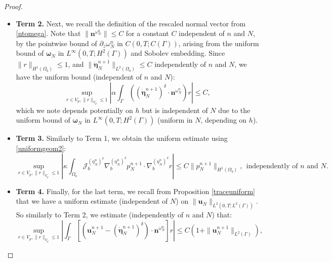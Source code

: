 \documentclass[10pt,a4paper]{amsart}
\newcommand{\bd}{\boldsymbol}
\begin{document}
\begin{proof}
\begin{itemize}
\begin{equation*}
\sup_{r \in V_{p}, \|r\|_{V_{p}} \le 1} \left|\alpha \int_{\Omega_{b}} \mathcal{J}^{(\eta^{n}_{N})^{\delta}}_{b} (\dot{\bd{\eta}}^{n + 1}_{N})^{\delta} \cdot \nabla^{(\eta^{n}_{N})^{\delta}}_{b} r \right| \le C, \qquad \text{ independently of $n$ and $N$}.
\end{equation*}
\item \textbf{Term 2.} Next, we recall the definition of the rescaled normal vector from \eqref{ntomega}. Note that $\|\bd{n}^{\omega^{n}_{N}}\| \le C$ for a constant $C$ independent of $n$ and $N$, by the pointwise bound of $\partial_{z}\omega^{n}_{N}$ in $C(0, T; C(\Gamma))$, arising from the uniform bound of $\bd{\omega}_{N}$ in $L^{\infty}(0, T; H^{2}(\Gamma))$ and Sobolev embedding. Since $\|r\|_{H^{1}(\Omega_{b})} \le 1$, and $\|\dot{\bd{\eta}}^{n + 1}_{N}\|_{L^{2}(\Omega_{b})} \le C$ independently of $n$ and $N$, we have the uniform bound (independent of $n$ and $N$):
\begin{equation*}
\sup_{r \in V_{p}, \|r\|_{V_{p}} \le 1} \left|\alpha \int_{\Gamma} \left(\left(\dot{\bd{\eta}}^{n + 1}_{N}\right)^{\delta} \cdot \bd{n}^{\omega^{n}_{N}}\right) r\right| \le C,
\end{equation*}
which we note depends potentially on $h$ but is independent of $N$ due to the uniform bound of $\bd{\omega}_{N}$ in $L^{\infty}(0, T; H^{2}(\Gamma))$ (uniform in $N$, depending on $h$).  
\item \textbf{Term 3.} Similarly to Term 1, we obtain the uniform estimate using \eqref{uniformgeom2}:
\begin{equation*}
\sup_{r \in V_{p}, \|r\|_{V_{p}} \le 1} \left|\kappa \int_{\Omega_{b}} \mathcal{J}^{(\eta^{n}_{N})^{\delta}}_{b} \nabla^{(\eta^{n}_{N})^{\delta}}_{b} p^{n + 1}_{N} \cdot \nabla^{(\eta^{n}_{N})^{\delta}}_{b} r\right| \le C\|p^{n + 1}_{N}\|_{H^{1}(\Omega_{b})}, \ \ \text{independently of $n$ and $N$}.
\end{equation*}
\item \textbf{Term 4.} Finally, for the last term, we recall from Proposition \ref{traceuniform} that we have a uniform estimate (independent of $N$) on $\|\bd{u}_{N}\|_{L^{2}(0, T; L^{2}(\Gamma))}$. So similarly to Term 2, we estimate (independently of $n$ and $N$) that:
\begin{equation*}
\sup_{r \in V_{p}, \|r\|_{V_{p}} \le 1} \left|\int_{\Gamma} \left[\left(\bd{u}^{n + 1}_{N} - (\dot{\bd{\eta}}^{n + 1}_{N})^{\delta}\right) \cdot \bd{n}^{\omega^{n}_{N}}\right] r\right| \le C\left(1 + \|\bd{u}^{n + 1}_{N}\|_{L^{2}(\Gamma)}\right),

\end{equation*}
\end{itemize}
\end{proof}
\end{document}
